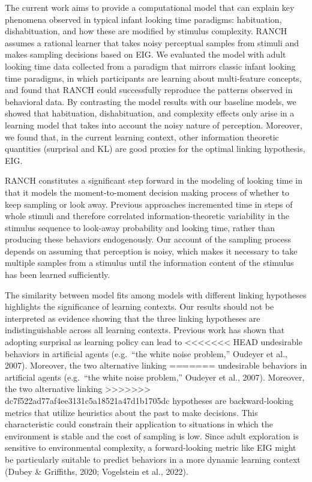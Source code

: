 \documentclass[10pt, letterpaper]{article}
\begin{document}
The current work aims to provide a computational model that can explain
key phenomena observed in typical infant looking time paradigms:
habituation, dishabituation, and how these are modified by stimulus
complexity. RANCH assumes a rational learner that takes noisy perceptual
samples from stimuli and makes sampling decisions based on EIG. We
evaluated the model with adult looking time data collected from a
paradigm that mirrors classic infant looking time paradigms, in which
participants are learning about multi-feature concepts, and found that
RANCH could successfully reproduce the patterns observed in behavioral
data. By contrasting the model results with our baseline models, we
showed that habituation, dishabituation, and complexity effects only
arise in a learning model that takes into account the noisy nature of
perception. Moreover, we found that, in the current learning context,
other information theoretic quantities (surprisal and KL) are good
proxies for the optimal linking hypothesis, EIG.

RANCH constitutes a significant step forward in the modeling of looking
time in that it models the moment-to-moment decision making process of
whether to keep sampling or look away. Previous approaches incremented
time in steps of whole stimuli and therefore correlated
information-theoretic variability in the stimulus sequence to look-away
probability and looking time, rather than producing these behaviors
endogenously. Our account of the sampling process depends on assuming
that perception is noisy, which makes it necessary to take multiple
samples from a stimulus until the information content of the stimulus
has been learned sufficiently.

The similarity between model fits among models with different linking
hypotheses highlights the significance of learning contexts. Our results
should not be interpreted as evidence showing that the three linking
hypotheses are indistinguishable across all learning contexts. Previous
work has shown that adopting surprisal as learning policy can lead to
<<<<<<< HEAD
undesirable behaviors in artificial agents (e.g.~``the white noise
problem,'' Oudeyer et al., 2007). Moreover, the two alternative linking
=======
undesirable behaviors in artificial agents (e.g.~{``the white noise
problem,''} Oudeyer et al., 2007). Moreover, the two alternative linking
>>>>>>> dc7f522ad77af4ee3131c5a18521a47d1b1705dc
hypotheses are backward-looking metrics that utilize heuristics about
the past to make decisions. This characteristic could constrain their
application to situations in which the environment is stable and the
cost of sampling is low. Since adult exploration is sensitive to
environmental complexity, a forward-looking metric like EIG might be
particularly suitable to predict behaviors in a more dynamic learning
context (Dubey \& Griffiths, 2020; Vogelstein et al., 2022).
\end{document}
